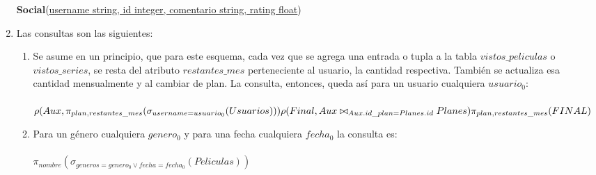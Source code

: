 \documentclass[letter]{article}
\begin{document}
\begin{pregunta}{1}
\begin{enumerate}
\begin{center}
				\textbf{Social}(\underline{username string, id integer, comentario string, rating float}) \\
			\end{center}
		\item Las consultas son las siguientes:
			\begin{enumerate}[(1)]
				\item \addtocounter{enumii}{1}
					Se asume en un principio, que para este esquema, cada vez que se agrega una entrada o tupla a la tabla $vistos\_peliculas$ o $vistos\_series$, se resta del atributo $restantes\_mes$ perteneciente al usuario, la cantidad respectiva. También se actualiza esa cantidad mensualmente y al cambiar de plan. La consulta, entonces, queda así para un usuario cualquiera $usuario_0$:\\ \\
					$\rho(Aux, \pi_{plan, restantes\_mes}(\sigma_{username=usuario_0}(Usuarios))) \\
					\rho(Final, Aux \bowtie_{Aux.id\_plan=Planes.id} Planes) \\
					\pi_{plan, restantes\_mes}(FINAL)$\\
    				\item
    					Para un género cualquiera $genero_0$ y para una fecha cualquiera $fecha_0$ la consulta es:\\ \\
    					$\pi_{nombre}(\sigma_{generos=genero_0 \vee fecha=fecha_0}(Peliculas))  $
			\end{enumerate}
		\end{enumerate}
	\end{pregunta}
\end{document}
